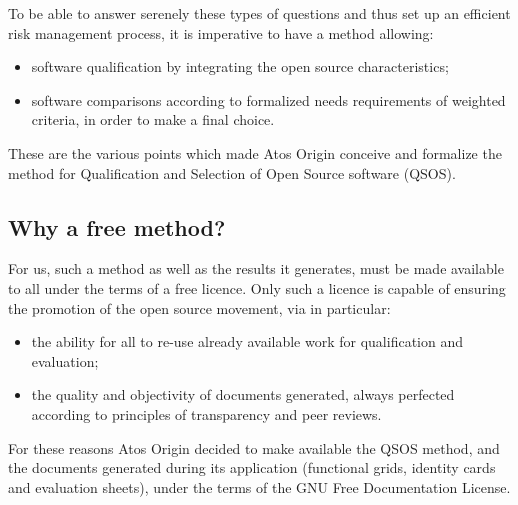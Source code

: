 To be able to answer serenely these types of questions and thus set up an
efficient risk management process, it is imperative to have a method allowing:
\begin{itemize}
\item software qualification by integrating the open source characteristics;
\item software comparisons according to formalized needs requirements of weighted criteria, in order to make a final choice.
\end{itemize}

These are the various points which made Atos Origin conceive and formalize the method for Qualification and Selection of Open Source software (QSOS).


\subsection{Why a free method?}
For us, such a method as well as the results it generates, must be made available to all under the terms of a free licence. Only such a licence is capable of ensuring the promotion of the open source movement, via in particular:
\begin{itemize}
\item the ability for all to re-use already available work for qualification and evaluation;
\item the quality and objectivity of documents generated, always perfected according to principles of transparency and
peer reviews.
\end{itemize}
For these reasons Atos Origin decided to make available the QSOS method, and the documents generated during its application (functional grids, identity cards and evaluation sheets), under the terms of the GNU Free Documentation License.
